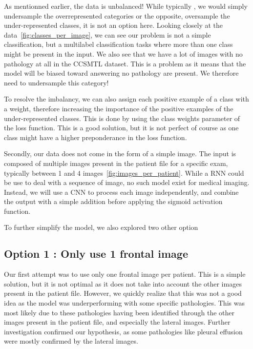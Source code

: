 \documentclass[11pt]{article}
\begin{document}
   

    As mentionned earlier, the data is unbalanced! While typically , we would simply undersample the overrepresented
    categories or the opposite, oversample the under-represented classes, it is not an option here. Looking closely at the data~\ref{fig:classes_per_image},
    we can see our problem is not a simple classification, but a multilabel classification tasks where more than one class might be present
    in the input. We also see that we have a lot of images with no pathology at all in the CCSMTL dataset. This is a 
    problem as it means that the model will be biased toward answering no pathology are present. We therefore need 
    to undersample this category!



    To resolve the imbalancy, we can also assign each positive example of a class with a weight, therefore increasing the importance of the positive examples of the under-represented classes. This is
    done by using the class weights parameter of the loss function. This is a good solution, but it is not perfect of course as one class might have a higher preponderance in the loss
    function.
    
    Secondly, our data does not come in the form of a simple image. The input is composed of multiple images present 
    in the patient file for a specific exam, typically between 1 and 4 images~\ref{fig:images_per_patient}. While a RNN could be use to deal
    with a sequence of image, no such model exist for medical imaging. Instead, we will use a CNN to process each image independently, and combine the output with a simple addition before applying the sigmoid activation function.

    To further simplify the model, we also explored two other option

    \subsection{Option 1 : Only use 1 frontal image}
        Our first attempt was to use only one frontal image per patient. This is a simple solution, but it is not optimal as it does not take into account the other images present in the patient file.
        However, we quickly realize that this was not a good idea as the model was underperforming with some specific pathologies. This was most
        likely due to these pathologies having been identified through the other images present in the patient file, and especially the lateral images.
        Further investigation confirmed our hypothesis, as some pathologies like pleural effusion were mostly confirmed by the lateral images.
\end{document}
